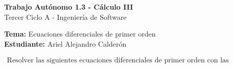 \documentclass[answers]{exam}
\begin{document}
\begin{center}
	\large\textbf{Trabajo Autónomo 1.3 - Cálculo III}\\[1em]
	\large Tercer Ciclo A - Ingeniería de Software\\[1em]
\end{center}

\vspace{0.5cm}
\noindent
\large\textbf{Tema:} Ecuaciones diferenciales de primer orden  \\
\large\textbf{Estudiante:} Ariel Alejandro Calderón

\vspace{0.3cm}

\begin{align*}
	\text{Resolver las siguientes ecuaciones diferenciales de primer orden con las condiciones iniciales dadas.}
\end{align*}
\end{document}
